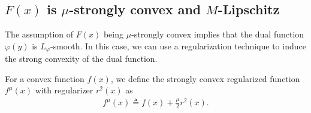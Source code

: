 \documentclass[final]{siamart1116}
\numberwithin{theorem}{section}
\begin{document}
	\subsection{$F(x)$ is $\mu$-strongly convex and $M$-Lipschitz}
	
	The assumption of $F(x)$ being \mbox{$\mu$-strongly} convex implies that the dual function $\varphi(y)$ is $L_\varphi$-smooth. In this case, we can use a regularization technique to induce the strong convexity of the dual function.
	
	\begin{definition}
		For a convex function $f(x)$, we define the strongly convex regularized function $f^\mu(x)$ with regularizer $r^2(x)$ as
		\begin{align}\label{regularizer}
		f^\mu(x) \triangleq f(x) + \frac{\mu}{2}r^2(x).
		\end{align}
	\end{definition}
	
\end{document}
